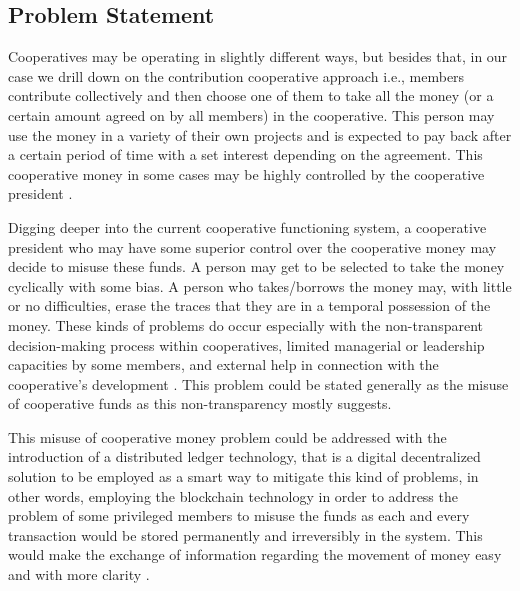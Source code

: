\documentclass{article}
\begin{document}
\begin{flushleft}
\subsection{Problem Statement}
Cooperatives may be operating in slightly different ways, but besides that, in our case we drill down on the contribution cooperative approach i.e., members contribute collectively and then choose one of them to take all the money (or a certain amount agreed on by all members) in the cooperative. This person may use the money in a variety of their own projects and is expected to pay back after a certain period of time with a set interest depending on the agreement. This cooperative money in some cases may be highly controlled by the cooperative president \cite{nilsson2013cooperative}.

Digging deeper into the current cooperative functioning system, a cooperative president who may have some superior control over the cooperative money may decide to misuse these funds. A person may get to be selected to take the money cyclically with some bias. A person who takes/borrows the money may, with little or no difficulties, erase the traces that they are in a temporal possession of the money. These kinds of problems do occur especially with the non-transparent decision-making process within cooperatives, limited managerial or leadership capacities by some members, and external help in connection with the cooperative's development \cite{rca001}. This problem could be stated generally as the misuse of cooperative funds as this non-transparency mostly suggests.

This misuse of cooperative money problem could be addressed with the introduction of a distributed ledger technology, that is a digital decentralized solution to be employed as a smart way to mitigate this kind of problems, in other words, employing the blockchain technology in order to address the problem of some privileged members to misuse the funds as each and every transaction would be stored permanently and irreversibly in the system. This would make the exchange of information regarding the movement of money easy and with more clarity \cite{rodrigues2019evaluating}.


\end{flushleft}
\end{document}
